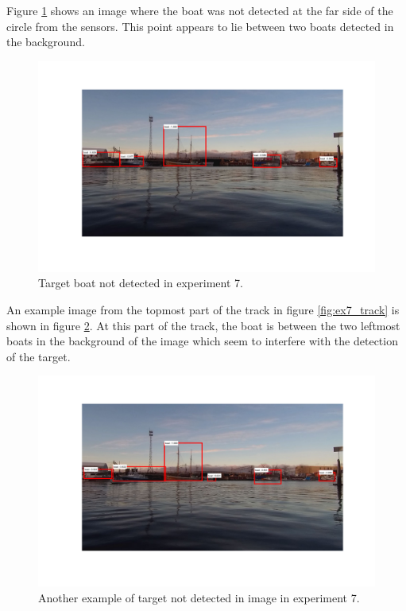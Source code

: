 Figure \ref{fig:ex7_issue} shows an image where the boat was not detected at the far side of the circle from the sensors. This point appears to lie between two boats detected in the background.
\begin{figure}[!htb]
	\centering
	\includegraphics[width=\linewidth]{fig/ex7_miss_first_circ.png}
	\caption{Target boat not detected in experiment 7.}
	\label{fig:ex7_issue}
\end{figure}

An example image from the topmost part of the track in figure \ref{fig:ex7_track} is shown in figure \ref{fig:issues_ex7_2}. At this part of the track, the boat is between the two leftmost boats in the background of the image which seem to interfere with the detection of the target.
\begin{figure}[!htb]
	\centering
	\includegraphics[width=\linewidth]{fig/ex7_miss_top.png}
	\caption{Another example of target not detected in image in experiment 7.}
	\label{fig:issues_ex7_2}
\end{figure}

